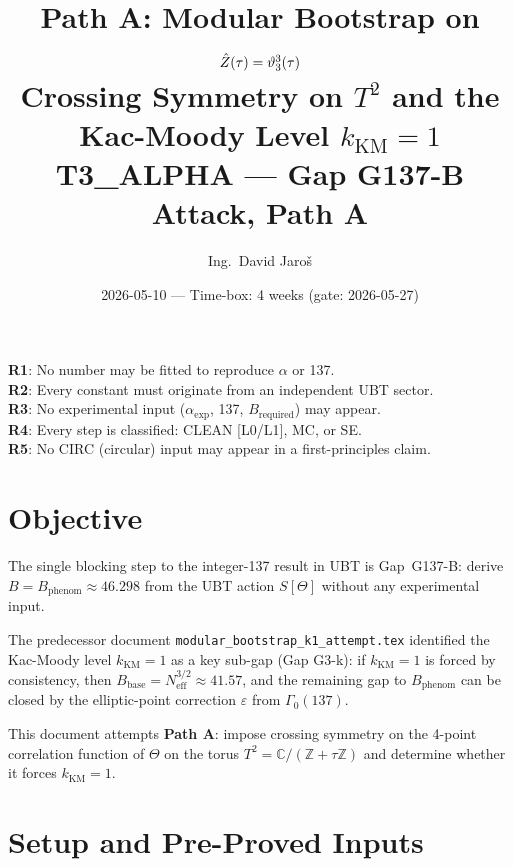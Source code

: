 \documentclass[12pt,a4paper]{article}
\title{\textbf{Path A: Modular Bootstrap on $\hat{Z}(\tau) = \vartheta_3^3(\tau)$}\\[6pt]
  \large Crossing Symmetry on $T^2$ and the Kac-Moody Level $k_{\mathrm{KM}} = 1$\\[4pt]
  \normalsize T3\_ALPHA — Gap G137-B Attack, Path A}
\author{Ing.\ David Jaroš}
\date{2026-05-10 — Time-box: 4 weeks (gate: 2026-05-27)}
\theoremstyle{definition}
\theoremstyle{remark}
\newcommand{\CC}{\mathbb{C}}
\newcommand{\ZZ}{\mathbb{Z}}
\begin{document}
\maketitle

\begin{tcolorbox}[enhanced,colback=orange!5!white,colframe=orange!60!black,
  arc=3pt,boxrule=1.2pt,title={\textbf{Hard Rules (Non-Negotiable, from ALPHA\_BREAKTHROUGH\_REPORT.md)}}]
\textbf{R1}: No number may be fitted to reproduce $\alpha$ or 137.\\
\textbf{R2}: Every constant must originate from an independent UBT sector.\\
\textbf{R3}: No experimental input ($\alpha_{\exp}$, 137, $B_{\mathrm{required}}$) may appear.\\
\textbf{R4}: Every step is classified: CLEAN [L0/L1], MC, or SE.\\
\textbf{R5}: No CIRC (circular) input may appear in a first-principles claim.
\end{tcolorbox}

\tableofcontents

\section{Objective}
\label{sec:obj}

The single blocking step to the integer-137 result in UBT is Gap~G137-B:
derive $B = B_{\mathrm{phenom}} \approx 46.298$ from the UBT action $S[\Theta]$
without any experimental input.

The predecessor document \texttt{modular\_bootstrap\_k1\_attempt.tex} identified
the Kac-Moody level $k_{\mathrm{KM}} = 1$ as a key sub-gap (Gap G3-k): if
$k_{\mathrm{KM}} = 1$ is forced by consistency, then
$B_{\mathrm{base}} = N_{\mathrm{eff}}^{3/2} \approx 41.57$, and the remaining
gap to $B_{\mathrm{phenom}}$ can be closed by the elliptic-point correction
$\varepsilon$ from $\Gamma_0(137)$.

This document attempts \textbf{Path A}: impose crossing symmetry on the 4-point
correlation function of $\Theta$ on the torus $T^2 = \CC/(\ZZ + \tau\ZZ)$ and
determine whether it forces $k_{\mathrm{KM}} = 1$.

\section{Setup and Pre-Proved Inputs}
\label{sec:setup}
\end{document}
